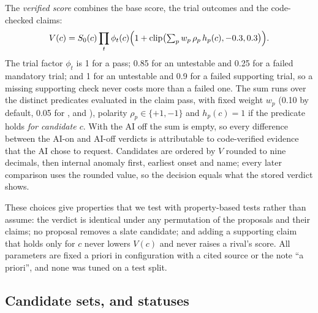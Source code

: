 The \emph{verified score} combines the base score, the trial outcomes and the code-checked claims:
\begin{equation}
V(c) = S_0(c) \prod_{t} \phi_t(c) \Bigl(1 + \operatorname{clip}\bigl(\textstyle\sum_{p} w_p\, \rho_p\, h_p(c), -0.3, 0.3\bigr)\Bigr).
\end{equation}
The trial factor $\phi_t$ is 1 for a pass; 0.85 for an untestable and 0.25 for a failed mandatory trial; and 1 for an untestable and 0.9 for a failed supporting trial, so a missing supporting check never costs more than a failed one.
The sum runs over the distinct predicates evaluated in the claim pass, with fixed weight $w_p$ (0.10 by default, 0.05 for ,  and ), polarity $\rho_p \in \{+1,-1\}$ and $h_p(c) = 1$ if the predicate holds \emph{for candidate $c$}.
With the AI off the sum is empty, so every difference between the AI-on and AI-off verdicts is attributable to code-verified evidence that the AI chose to request.
Candidates are ordered by $V$ rounded to nine decimals, then internal anomaly first, earliest onset and name; every later comparison uses the rounded value, so the decision equals what the stored verdict shows.

These choices give properties that we test with property-based tests rather than assume: the verdict is identical under any permutation of the proposals and their claims; no proposal removes a slate candidate; and adding a supporting claim that holds only for $c$ never lowers $V(c)$ and never raises a rival's score.
All parameters are fixed a priori in configuration with a cited source or the note ``a priori'', and none was tuned on a test split.

\subsection{Candidate sets, \NOFAULT and statuses}
\label{sec:conformal}

